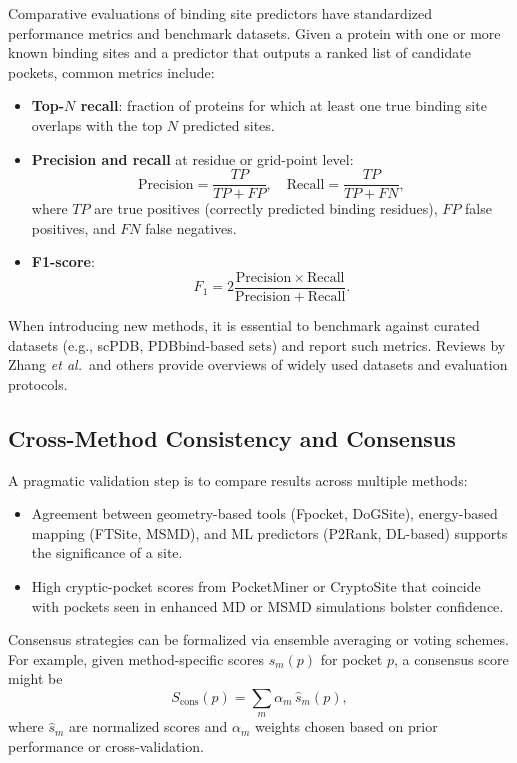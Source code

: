 \documentclass[12pt,a4paper]{article}
\begin{document}
Comparative evaluations of binding site predictors have standardized performance metrics and benchmark datasets.\cite{CH5_ghersi2011beyond,CH5_zhao2020exploring} Given a protein with one or more known binding sites and a predictor that outputs a ranked list of candidate pockets, common metrics include:
\begin{itemize}
    \item \textbf{Top-\(N\) recall}: fraction of proteins for which at least one true binding site overlaps with the top \(N\) predicted sites.
    \item \textbf{Precision and recall} at residue or grid-point level:
    \begin{equation}
    \mathrm{Precision} = \frac{TP}{TP + FP}, \quad \mathrm{Recall} = \frac{TP}{TP + FN},
    \label{eq:precision_recall}
    \end{equation}
    where \(TP\) are true positives (correctly predicted binding residues), \(FP\) false positives, and \(FN\) false negatives.
    \item \textbf{F1-score}:
    \begin{equation}
    F_1 = 2 \frac{\mathrm{Precision} \times \mathrm{Recall}}{\mathrm{Precision} + \mathrm{Recall}}.
    \end{equation}
\end{itemize}

When introducing new methods, it is essential to benchmark against curated datasets (e.g., scPDB, PDBbind-based sets) and report such metrics. Reviews by Zhang \emph{et al.}\ and others provide overviews of widely used datasets and evaluation protocols.\cite{CH5_zhao2020exploring}

\subsection{Cross-Method Consistency and Consensus}

A pragmatic validation step is to compare results across multiple methods:
\begin{itemize}
    \item Agreement between geometry-based tools (Fpocket, DoGSite), energy-based mapping (FTSite, MSMD), and ML predictors (P2Rank, DL-based) supports the significance of a site.\cite{CH5_LeGuilloux2009,CH5_Volkamer2012,CH5_Krivak2018}
    \item High cryptic-pocket scores from PocketMiner or CryptoSite that coincide with pockets seen in enhanced MD or MSMD simulations bolster confidence.\cite{CH5_meller2023predicting,CH5_Kuzmanic2020}
\end{itemize}
Consensus strategies can be formalized via ensemble averaging or voting schemes. For example, given method-specific scores \(s_m(p)\) for pocket \(p\), a consensus score might be
\begin{equation}
S_{\mathrm{cons}}(p) = \sum_{m} \alpha_m \, \hat{s}_m(p),
\end{equation}
where \(\hat{s}_m\) are normalized scores and \(\alpha_m\) weights chosen based on prior performance or cross-validation.
\end{document}
